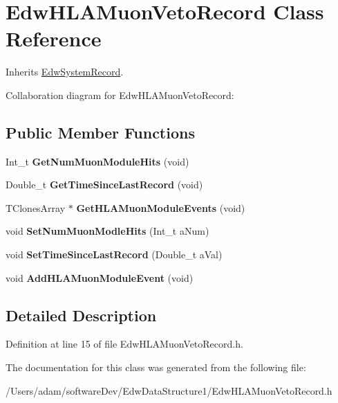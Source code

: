 \hypertarget{class_edw_h_l_a_muon_veto_record}{
\section{EdwHLAMuonVetoRecord Class Reference}
\label{class_edw_h_l_a_muon_veto_record}
}


Inherits \hyperlink{class_edw_system_record}{EdwSystemRecord}.



Collaboration diagram for EdwHLAMuonVetoRecord:\subsection*{Public Member Functions}
\begin{DoxyCompactItemize}
\item 
\hypertarget{class_edw_h_l_a_muon_veto_record_a81bc3018a20cb30275c17fb207aca68b}{
Int\_\-t {\bfseries GetNumMuonModuleHits} (void)}
\label{class_edw_h_l_a_muon_veto_record_a81bc3018a20cb30275c17fb207aca68b}

\item 
\hypertarget{class_edw_h_l_a_muon_veto_record_abc9115239bb7fddf059c609596ce50c6}{
Double\_\-t {\bfseries GetTimeSinceLastRecord} (void)}
\label{class_edw_h_l_a_muon_veto_record_abc9115239bb7fddf059c609596ce50c6}

\item 
\hypertarget{class_edw_h_l_a_muon_veto_record_a619f9355bb9b73ea5206f6f888f82796}{
TClonesArray $\ast$ {\bfseries GetHLAMuonModuleEvents} (void)}
\label{class_edw_h_l_a_muon_veto_record_a619f9355bb9b73ea5206f6f888f82796}

\item 
\hypertarget{class_edw_h_l_a_muon_veto_record_ab01d61074a317a933835bfc79ad37379}{
void {\bfseries SetNumMuonModleHits} (Int\_\-t aNum)}
\label{class_edw_h_l_a_muon_veto_record_ab01d61074a317a933835bfc79ad37379}

\item 
\hypertarget{class_edw_h_l_a_muon_veto_record_ab2d84690617ce9d5aad46c04b1055d8b}{
void {\bfseries SetTimeSinceLastRecord} (Double\_\-t aVal)}
\label{class_edw_h_l_a_muon_veto_record_ab2d84690617ce9d5aad46c04b1055d8b}

\item 
\hypertarget{class_edw_h_l_a_muon_veto_record_a50028eacda8b04c0887261399d232b78}{
void {\bfseries AddHLAMuonModuleEvent} (void)}
\label{class_edw_h_l_a_muon_veto_record_a50028eacda8b04c0887261399d232b78}

\end{DoxyCompactItemize}


\subsection{Detailed Description}


Definition at line 15 of file EdwHLAMuonVetoRecord.h.



The documentation for this class was generated from the following file:\begin{DoxyCompactItemize}
\item 
/Users/adam/softwareDev/EdwDataStructure1/EdwHLAMuonVetoRecord.h\end{DoxyCompactItemize}
